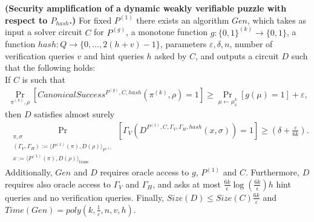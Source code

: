 \begin{lemma}\textbf{(Security amplification of a dynamic weakly verifiable puzzle with respect to $P_{hash}$.)}
  \label{lemma:sec_amp_for_p_hash}
  For fixed $P^{(1)}$ there exists an algorithm $Gen$,
  which takes as input a solver circuit $C$ for $P^{(g)}$, a monotone function $g:\{0,1\}^{(k)} \rightarrow \{0,1\}$,
  a function $hash : Q \rightarrow \{0, \dots, 2(h+v)-1\}$, parameters $\varepsilon, \delta, n$,
  number of verification queries $v$ and hint queries $h$ asked by $C$, and outputs a circuit $D$
  such that the following holds: \\
  If $C$ is such that \\
  \begin{align*}
    \underset{\pi^{(k)}, \rho}{\Pr}\left[CanonicalSuccess^{P^{(g)}, C, hash}(\pi^{(k)}, \rho)=1\right] \geq \underset{\mu \leftarrow \mu_\delta^k}{\Pr}[g(\mu) = 1] + \varepsilon,
  \end{align*}
  then $D$ satisfies almost surely
  \begin{align*}
    \underset{\substack{\pi, \sigma \\ (\Gamma_V,\Gamma_H) := \langle P^{(1)}(\pi), D(\rho) \rangle_{P^{(1)}} \\ x := \langle P^{(1)}(\pi), D(\rho) \rangle_{\text{trans}}}}
    {\Pr}\left[\Gamma_V(D^{P^{(1)},C,\Gamma_V, \Gamma_H, hash}(x, \sigma)) = 1\right] \geq (\delta + \frac{\varepsilon}{6k}).
  \end{align*}
  Additionally, $Gen$ and $D$ requires oracle access to $g$, $P^{(1)}$ and $C$.
  Furthermore, $D$ requires also oracle access to $\Gamma_V$ and $\Gamma_H$,
  and asks at most $\frac{6k}{\epsilon}\log\left(\frac{6k}{\epsilon}\right) h$ hint queries and no verification queries.
  Finally, $Size(D) \leq Size(C)\frac{6k}{\varepsilon}$ and $Time(Gen) = poly(k, \frac{1}{\varepsilon}, n, v, h)$.
\end{lemma}
%
